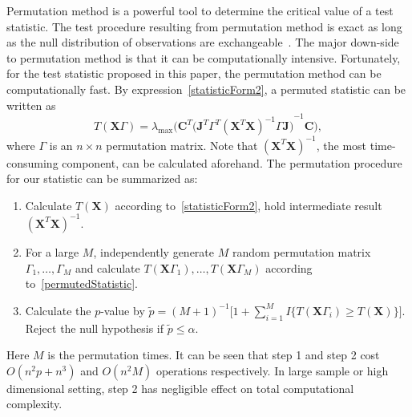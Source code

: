 \documentclass[12pt]{article} %
\newcommand{\bX}{\mathbf{X}}
\newcommand{\bJ}{\mathbf{J}}
\newcommand{\bC}{\mathbf{C}}
\theoremstyle{definition}
\begin{document}
Permutation method is a powerful tool to determine the critical value of a test statistic.
   The test procedure resulting from permutation method is exact as long as the null distribution of observations are exchangeable~\citep{Romano1990On}.
   The major down-side to permutation method is that it can be computationally intensive.
   Fortunately, for the test statistic proposed in this paper,  the permutation method can be computationally fast.
    By expression~\eqref{statisticForm2}, a permuted statistic can be written as
    \begin{equation}\label{permutedStatistic}
        T(\bX\Gamma)=\lambda_{\max}\Big(\bC^T{\big( \bJ^T \Gamma^T {(\bX^T \bX)}^{-1} \Gamma \bJ \big)}^{-1}  \bC\Big),
    \end{equation}
where $\Gamma$ is an $n\times n$ permutation matrix.
   Note that ${(\bX^T \bX)}^{-1}$, the most time-consuming component, can be calculated aforehand.
   The permutation procedure for our statistic can be summarized as:
   \begin{enumerate}
       \item
           Calculate $T(\bX)$ according to~\eqref{statisticForm2}, hold intermediate result ${(\bX^T \bX)}^{-1}$.
       \item For a large $M$, independently generate $M$ random permutation matrix $\Gamma_1,\ldots,\Gamma_M$ and calculate $T(\bX\Gamma_1),\ldots,T(\bX\Gamma_M)$ according to~\eqref{permutedStatistic}. 
       \item Calculate the $p$-value by
           $
           \tilde{p}={(M+1)}^{-1}\big[1+\sum_{i=1}^M I\{T(\bX\Gamma_i)\geq T(\bX)\}\big]
           $.
           Reject the null hypothesis if $\tilde{p}\leq \alpha$.
   \end{enumerate}

Here $M$ is the permutation times. 
   It can be seen that  step 1 and step 2 cost $O(n^2 p +n^3)$ and $O(n^2 M)$ operations respectively.
   In large sample or high dimensional setting, step 2 has negligible effect on total computational complexity.




   
   
   
\end{document}
